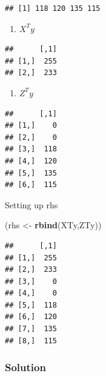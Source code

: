 \documentclass[]{article}
\newenvironment{Shaded}{\begin{snugshade}}{\end{snugshade}}
\newcommand{\KeywordTok}[1]{\textcolor[rgb]{0.13,0.29,0.53}{\textbf{#1}}}
\newcommand{\StringTok}[1]{\textcolor[rgb]{0.31,0.60,0.02}{#1}}
\newcommand{\OperatorTok}[1]{\textcolor[rgb]{0.81,0.36,0.00}{\textbf{#1}}}
\newcommand{\NormalTok}[1]{#1}
\providecommand{\tightlist}{%
  \setlength{\itemsep}{0pt}\setlength{\parskip}{0pt}}
\begin{document}
\begin{verbatim}
## [1] 118 120 135 115
\end{verbatim}

\begin{enumerate}
\def\labelenumi{\arabic{enumi}.}
\tightlist
\item
  \(X^Ty\)
\end{enumerate}

\begin{Shaded}
\end{Shaded}

\begin{verbatim}
##      [,1]
## [1,]  255
## [2,]  233
\end{verbatim}

\begin{enumerate}
\def\labelenumi{\arabic{enumi}.}
\setcounter{enumi}{1}
\tightlist
\item
  \(Z^Ty\)
\end{enumerate}

\begin{Shaded}
\end{Shaded}

\begin{verbatim}
##      [,1]
## [1,]    0
## [2,]    0
## [3,]  118
## [4,]  120
## [5,]  135
## [6,]  115
\end{verbatim}

Setting up rhs

\begin{Shaded}
\begin{Highlighting}[]
\NormalTok{(rhs <-}\StringTok{  }\KeywordTok{rbind}\NormalTok{(XTy,ZTy))}
\end{Highlighting}
\end{Shaded}

\begin{verbatim}
##      [,1]
## [1,]  255
## [2,]  233
## [3,]    0
## [4,]    0
## [5,]  118
## [6,]  120
## [7,]  135
## [8,]  115
\end{verbatim}

\subsubsection{Solution}\label{solution}
\end{document}
